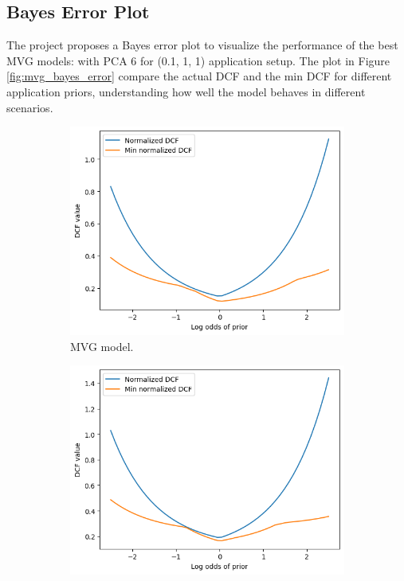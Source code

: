 \documentclass{article}
\begin{document}
\subsection{Bayes Error Plot}
The project proposes a Bayes error plot to visualize the performance of the best MVG models: with PCA 6 for (0.1, 1, 1) application setup. The plot in Figure \ref{fig:mvg_bayes_error} compare the actual DCF and the min DCF for different application priors, understanding how well the model behaves in different scenarios.

\begin{figure}[ht]
    \centering
    \begin{subfigure}[b]{0.3\textwidth}
        \centering
        \includegraphics[width=\textwidth]{images/mvg_bayes_error.png}
        \caption{MVG model.}
    \end{subfigure}
    \hfill
    \begin{subfigure}[b]{0.3\textwidth}
        \centering
        \includegraphics[width=\textwidth]{images/mvg_bayes_error_tied.png}

\end{subfigure}
\end{figure}
\end{document}
